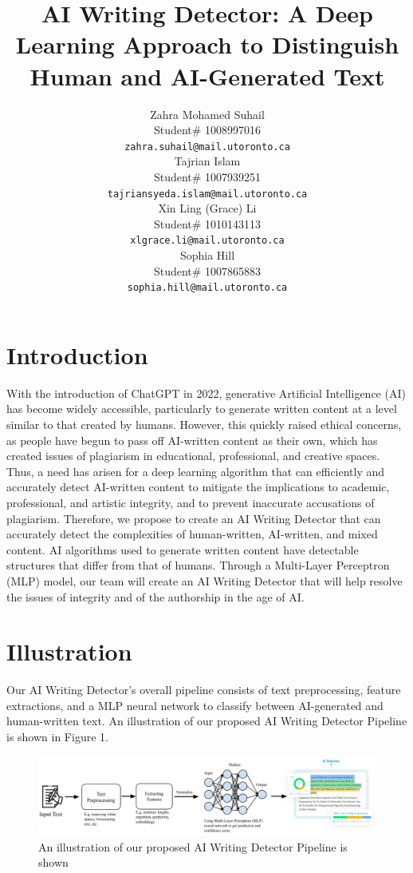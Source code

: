 \documentclass{article} %
\title{AI Writing Detector: A Deep Learning Approach to Distinguish Human and AI-Generated Text}
\author{Zahra Mohamed Suhail  \\
Student\# 1008997016 \\
\texttt{zahra.suhail@mail.utoronto.ca} \\
\And
Tajrian Islam \\
Student\# 1007939251 \\
\texttt{tajriansyeda.islam@mail.utoronto.ca} \\
\And
Xin Ling (Grace) Li  \\
Student\# 1010143113 \\
\texttt{xlgrace.li@mail.utoronto.ca} \\
\And
Sophia Hill  \\
Student\# 1007865883 \\
\texttt{sophia.hill@mail.utoronto.ca} \\
\And
}
\begin{document}
\maketitle
\newpage

\section{Introduction}
With the introduction of ChatGPT in 2022, generative Artificial Intelligence (AI) has become widely accessible, particularly to generate written content at a level similar to that created by humans. However, this quickly raised ethical concerns, as people have begun to pass off AI-written content as their own, which has created issues of plagiarism in educational, professional, and creative spaces. Thus, a need has arisen for a deep learning algorithm that can efficiently and accurately detect AI-written content to mitigate the implications to academic, professional, and artistic integrity, and to prevent inaccurate accusations of plagiarism. Therefore, we propose to create an AI Writing Detector that can accurately detect the complexities of human-written, AI-written, and mixed content. AI algorithms used to generate written content have detectable structures that differ from that of humans. Through a Multi-Layer Perceptron (MLP) model, our team will create an AI Writing Detector that will help resolve the issues of integrity and of the authorship in the age of AI.

\section{Illustration}
Our AI Writing Detector's overall pipeline consists of text preprocessing, feature extractions, and a MLP neural network to classify between AI-generated and human-written text. An illustration of our proposed AI Writing Detector Pipeline is shown in Figure 1.

\begin{figure}[htbp]
    \centering
    \includegraphics[width=0.9\linewidth]{illustration.png}
    \caption{An illustration of our proposed AI Writing Detector Pipeline is shown}
    \label{fig:pipeline}
\end{figure}
\end{document}
